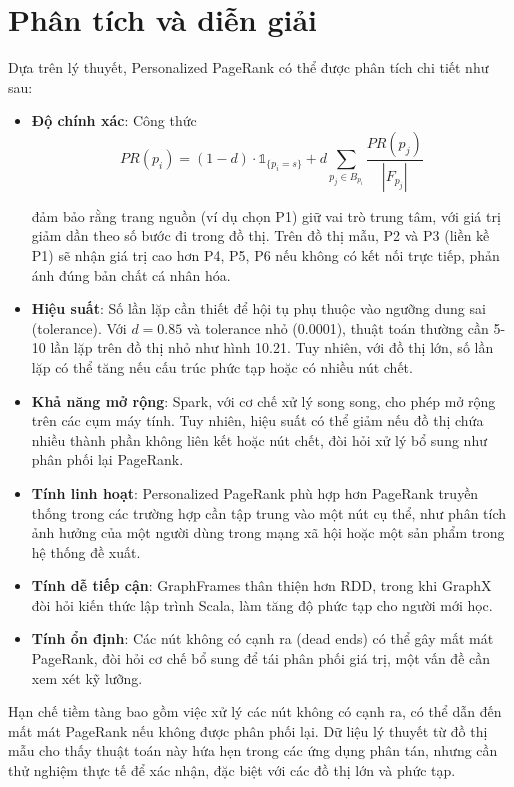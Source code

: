 \documentclass[conference]{IEEEtran}
\begin{document}
\section{Phân tích và diễn giải}
Dựa trên lý thuyết, Personalized PageRank có thể được phân tích chi tiết như sau:
\begin{itemize}
    \item \textbf{Độ chính xác}: Công thức 
    \begin{equation}
PR(p_i) = (1 - d) \cdot \mathbb{1}_{\{p_i = s\}} + d \sum_{p_j \in B_{p_i}} \frac{PR(p_j)}{|F_{p_j}|}
\end{equation}
    
    đảm bảo rằng trang nguồn (ví dụ chọn P1) giữ vai trò trung tâm, với giá trị giảm dần theo số bước đi trong đồ thị. Trên đồ thị mẫu, P2 và P3 (liền kề P1) sẽ nhận giá trị cao hơn P4, P5, P6 nếu không có kết nối trực tiếp, phản ánh đúng bản chất cá nhân hóa.
    \\
    \item \textbf{Hiệu suất}: Số lần lặp cần thiết để hội tụ phụ thuộc vào ngưỡng dung sai (tolerance). Với \( d = 0.85 \) và tolerance nhỏ (0.0001), thuật toán thường cần 5-10 lần lặp trên đồ thị nhỏ như hình 10.21. Tuy nhiên, với đồ thị lớn, số lần lặp có thể tăng nếu cấu trúc phức tạp hoặc có nhiều nút chết.
    \\
    \item \textbf{Khả năng mở rộng}: Spark, với cơ chế xử lý song song, cho phép mở rộng trên các cụm máy tính. Tuy nhiên, hiệu suất có thể giảm nếu đồ thị chứa nhiều thành phần không liên kết hoặc nút chết, đòi hỏi xử lý bổ sung như phân phối lại PageRank.
    \\
    \item \textbf{Tính linh hoạt}: Personalized PageRank phù hợp hơn PageRank truyền thống trong các trường hợp cần tập trung vào một nút cụ thể, như phân tích ảnh hưởng của một người dùng trong mạng xã hội hoặc một sản phẩm trong hệ thống đề xuất.
    \\
    \item \textbf{Tính dễ tiếp cận}: GraphFrames thân thiện hơn RDD, trong khi GraphX đòi hỏi kiến thức lập trình Scala, làm tăng độ phức tạp cho người mới học.
    \\
    \item \textbf{Tính ổn định}: Các nút không có cạnh ra (dead ends) có thể gây mất mát PageRank, đòi hỏi cơ chế bổ sung để tái phân phối giá trị, một vấn đề cần xem xét kỹ lưỡng.
\end{itemize}
\vspace{0.5em}
Hạn chế tiềm tàng bao gồm việc xử lý các nút không có cạnh ra, có thể dẫn đến mất mát PageRank nếu không được phân phối lại. Dữ liệu lý thuyết từ đồ thị mẫu cho thấy thuật toán này hứa hẹn trong các ứng dụng phân tán, nhưng cần thử nghiệm thực tế để xác nhận, đặc biệt với các đồ thị lớn và phức tạp.
\end{document}
